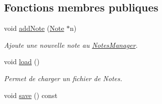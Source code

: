 \subsection*{Fonctions membres publiques}
\begin{DoxyCompactItemize}
\item 
void \hyperlink{class_notes_manager_a02dce4b055576ccc567fee8db07191dd}{add\-Note} (\hyperlink{class_note}{Note} $\ast$n)
\begin{DoxyCompactList}\small\item\em Ajoute une nouvelle note au \hyperlink{class_notes_manager}{Notes\-Manager}. \end{DoxyCompactList}\item 
\hypertarget{class_notes_manager_ad4fb2de50633dd25b71024343341cd64}{void \hyperlink{class_notes_manager_ad4fb2de50633dd25b71024343341cd64}{load} ()}\label{class_notes_manager_ad4fb2de50633dd25b71024343341cd64}

\begin{DoxyCompactList}\small\item\em Permet de charger un fichier de Notes. \end{DoxyCompactList}\item 
\hypertarget{class_notes_manager_a96c34db9c22dcdde2dfd92286de037e0}{void \hyperlink{class_notes_manager_a96c34db9c22dcdde2dfd92286de037e0}{save} () const }\label{class_notes_manager_a96c34db9c22dcdde2dfd92286de037e0}


\end{DoxyCompactItemize}
